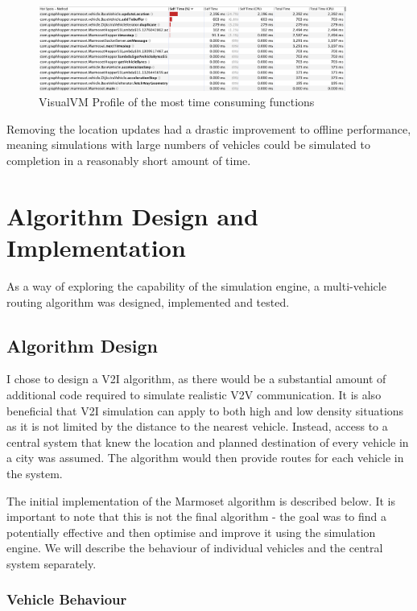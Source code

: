\documentclass[ %
                    author={Alexander Hill},
                supervisor={Dr. Benjamin Sach},
                    degree={MEng},
                     title={MARMOSET},
                  subtitle={Multi-Agent Route Management using Online Simulation for Efficient Transportation},
                      type={research},
                      year={2016} ]{dissertation}
\begin{document}
\begin{figure}[h]
    \centering
    \includegraphics[width=0.9\textwidth,clip,trim=0 7cm 0 0]{visualvm-profile}
    \caption{VisualVM Profile of the most time consuming functions}\label{fig:visualvm}
\end{figure}

Removing the location updates had a drastic improvement to offline performance,
meaning simulations with large numbers of vehicles could be simulated to
completion in a reasonably short amount of time.

\section{Algorithm Design and Implementation}

As a way of exploring the capability of the simulation engine, a multi-vehicle
routing algorithm was designed, implemented and tested.

\subsection{Algorithm Design}\label{sec:algo}

I chose to design a V2I algorithm, as there would be a substantial amount of
additional code required to simulate realistic V2V communication. It is also
beneficial that V2I simulation can apply to both high and low density situations
as it is not limited by the distance to the nearest vehicle. Instead, access to
a central system that knew the location and planned destination of every vehicle
in a city was assumed. The algorithm would then provide routes for each vehicle
in the system.

The initial implementation of the Marmoset algorithm is described below. It is
important to note that this is not the final algorithm - the goal was to find a
potentially effective and then optimise and improve it using the simulation
engine. We will describe the behaviour of individual vehicles and the central
system separately.

\subsubsection{Vehicle Behaviour}
\end{document}

